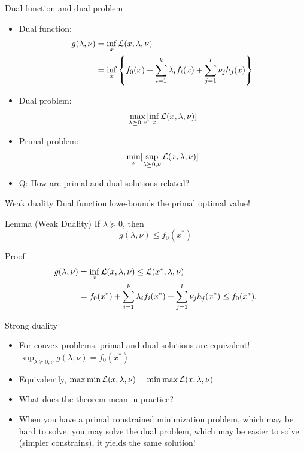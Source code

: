 \documentclass[draft]{beamer}
\begin{document}
\begin{frame}
	{Dual function and dual problem} 
	\begin{itemize}
		\item Dual function: 
		\begin{equation*}
			\begin{aligned}
				g(\lambda , \nu) & = \inf_x \mathcal{L} (x,\lambda,\nu ) \\ 
				& =\inf_x \left\{ f_0(x)+\sum_{i=1}^{k} \lambda_i f_i(x) + \sum_{j=1}^{l} \nu_j h_j (x) \right\}  \\
			\end{aligned}
		\end{equation*}
		 
		\item Dual problem: \[\max_{\lambda \succeq 0,\nu} [\inf_{x} \mathcal{L}(x,\lambda, \nu)] \] 
		\item Primal problem: \[\min_x [\sup_{\lambda \succeq 0, \nu} \mathcal{L}(x,\lambda, \nu)] \] 
		\item Q: How are primal and dual solutions related? 
	\end{itemize}
\end{frame}
\begin{frame}
	{Weak duality} 
	Dual function lowe-bounds the primal optimal value!
	\begin{block}{Lemma (Weak Duality)}
		If $\lambda \succeq 0$, then \[
			g(\lambda, \nu) \le f_0 (x^*)
			\]
	\end{block} 
	\begin{block}{Proof.}
		\begin{equation*}
			\begin{aligned}
				g(\lambda, \nu) & = \inf_x \mathcal{L} (x,\lambda,\nu) \le \mathcal{L} (x^*, \lambda, \nu ) \\
				& = f_0(x^*) +\sum_{i=1}^{k} \lambda_i f_i(x^*) + \sum_{j=1}^{l} \nu_j h_j (x^*) \le f_0(x^*). \\ 
			\end{aligned}
		\end{equation*}
	\end{block}
	
\end{frame}

\begin{frame}
	{Strong duality} 
	\begin{itemize}
		\item For convex problems, primal and dual solutions are equivalent! $\sup_{\lambda \succeq 0, \nu } g(\lambda,\nu) =f_0(x^*) $ 
		\item Equivalently, $\max \min \mathcal{L} (x , \lambda, \nu) =\min \max \mathcal{L} (x, \lambda, \nu) $ 
		\item What does the theorem mean in practice? 
		
		\item When you have a primal constrained minimization problem, which may be hard to solve, you may solve the dual problem, which may be easier to solve (simpler constrains), it yields the same solution!  
		
	\end{itemize}
\end{frame}
\end{document}
